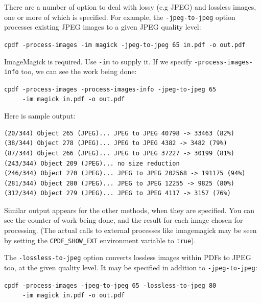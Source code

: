 \documentclass{book}
\begin{document}
There are a number of option to deal with lossy (e.g JPEG) and lossless images, one or more of which is specified. For example, the \texttt{-jpeg-to-jpeg} option processes existing JPEG images to a given JPEG quality level:

  \begin{framed}
  \noindent\small\verb!cpdf -process-images -im magick -jpeg-to-jpeg 65 in.pdf -o out.pdf!
  \end{framed}

\noindent ImageMagick is required. Use \texttt{-im} to supply it. If we specify \texttt{-process-images-info} too, we can see the work being done:

  \begin{framed}
  \noindent\small\verb!cpdf -process-images -process-images-info -jpeg-to-jpeg 65!\\
  \noindent\small\verb!     -im magick in.pdf -o out.pdf!
  \end{framed}

\noindent Here is sample output:

\begin{framed}
{\small\begin{verbatim}
(20/344) Object 265 (JPEG)... JPEG to JPEG 40798 -> 33463 (82%)
(38/344) Object 278 (JPEG)... JPEG to JPEG 4382 -> 3482 (79%)
(87/344) Object 266 (JPEG)... JPEG to JPEG 37227 -> 30199 (81%)
(243/344) Object 209 (JPEG)... no size reduction
(246/344) Object 270 (JPEG)... JPEG to JPEG 202568 -> 191175 (94%)
(281/344) Object 280 (JPEG)... JPEG to JPEG 12255 -> 9825 (80%)
(312/344) Object 279 (JPEG)... JPEG to JPEG 4117 -> 3157 (76%)
\end{verbatim}}
  \end{framed}

\noindent Similar output appears for the other methods, when they are specified. You can see the counter of work being done, and the result for each image chosen for processing. (The actual calls to external processes like imagemagick may be seen by setting the \texttt{CPDF\_SHOW\_EXT} environment variable to \texttt{true}).

The \texttt{-lossless-to-jpeg} option converts lossless images within PDFs to JPEG too, at the given quality level. It may be specified in addition to \texttt{-jpeg-to-jpeg}:

  \begin{framed}
  \noindent\small\verb!cpdf -process-images -jpeg-to-jpeg 65 -lossless-to-jpeg 80!\\
  \noindent\small\verb!     -im magick in.pdf -o out.pdf!
  \end{framed}
\end{document}
